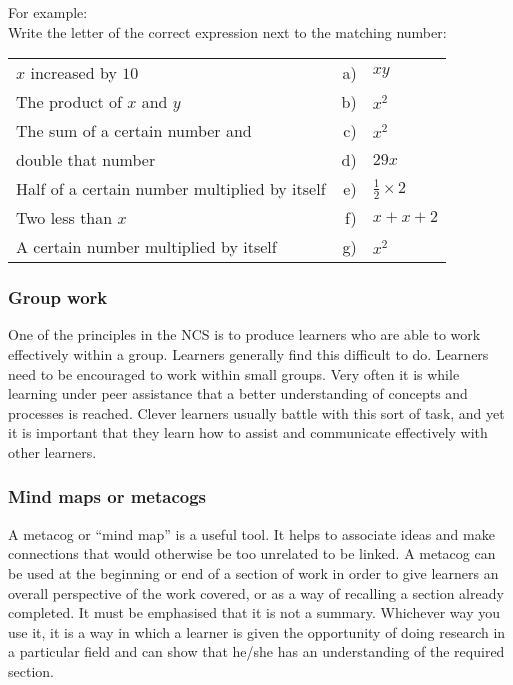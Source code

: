 For example: \\
Write the letter of the correct expression next to the matching number:\\
\begin{table}[H]
 \begin{center}
  \begin{tabular}{lrl} 
$x$ increased by $10$&					a)	&$xy$ \\
The product of  $x$ and $ y$		 &		 b)	&$x^2$\\
The sum of a certain number and 	&		c)&	$x^2$\\
double that number&					d)&	$29x$	\\
Half of a certain number multiplied by itself	&	e)&	$\frac{1}{2} \times 2$\\
Two less than  $x$&					f)&	$x + x + 2  $\\
A certain number multiplied by itself	&		g)&	$x^ 2$\\
  \end{tabular}
 \end{center}
\end{table}

\subsubsection{Group work}
One of the principles in the NCS is to produce learners who are able to work effectively within a group. Learners generally find this difficult to do. Learners need to be encouraged to work within small groups. Very often it is while learning under peer assistance that a better understanding of concepts and processes is reached. Clever learners usually battle with this sort of task, and yet it is important that they learn how to assist and communicate effectively with other learners. \par

\subsubsection{Mind maps or metacogs}
A metacog or “mind map” is a useful tool. It helps to associate ideas and make connections that would otherwise be too unrelated to be linked. A metacog can be used at the beginning or end of a section of work in order to give learners an overall perspective of the work covered, or as a way of recalling a section already completed. It must be emphasised that it is not a summary. Whichever way you use it, it is a way in which a learner is given the opportunity of doing research in a particular field and can show that he/she has an understanding of the required section. \par 

